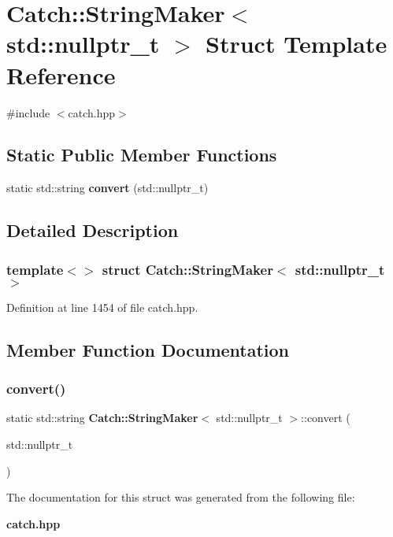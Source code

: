 \section{Catch\+::String\+Maker$<$ std\+::nullptr\+\_\+t $>$ Struct Template Reference}
\label{struct_catch_1_1_string_maker_3_01std_1_1nullptr__t_01_4}


{\ttfamily \#include $<$catch.\+hpp$>$}

\subsection*{Static Public Member Functions}
\begin{DoxyCompactItemize}
\item 
static std\+::string \textbf{ convert} (std\+::nullptr\+\_\+t)
\end{DoxyCompactItemize}


\subsection{Detailed Description}
\subsubsection*{template$<$$>$\newline
struct Catch\+::\+String\+Maker$<$ std\+::nullptr\+\_\+t $>$}



Definition at line 1454 of file catch.\+hpp.



\subsection{Member Function Documentation}
\mbox{\label{struct_catch_1_1_string_maker_3_01std_1_1nullptr__t_01_4_a131fbb1f5cd68c93aaf30d34e3519e9c}} 
\subsubsection{convert()}
{\footnotesize\ttfamily static std\+::string \textbf{ Catch\+::\+String\+Maker}$<$ std\+::nullptr\+\_\+t $>$\+::convert (\begin{DoxyParamCaption}\item[{std\+::nullptr\+\_\+t}]{ }\end{DoxyParamCaption})\hspace{0.3cm}{\ttfamily [static]}}



The documentation for this struct was generated from the following file\+:\begin{DoxyCompactItemize}
\item 
\textbf{ catch.\+hpp}\end{DoxyCompactItemize}
